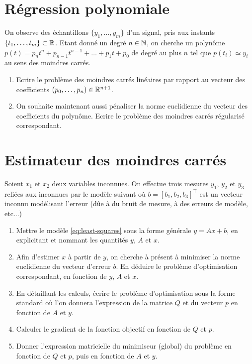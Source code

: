 \section{Régression polynomiale}

On observe des échantillons $\{y_1,\ldots,y_m\}$ d'un signal, pris aux instants $\{t_1,\ldots,t_m\} \subset \mathbb{R}$. Etant donné un degré $n \in \mathbb{N}$, on cherche un polynôme $p(t) = p_n t^n + p_{n-1}t^{n-1} + \ldots + p_1 t + p_0$ de degré au plus $n$ tel que $p(t_i) \simeq y_i$ au sens des moindres carrés.
\begin{enumerate}
	\item Ecrire le problème des moindres carrés linéaires par rapport au  vecteur des coefficients $(p_0,\ldots, p_{n}) \in \mathbb{R}^{n+1}$.
	\item On souhaite maintenant aussi pénaliser la norme euclidienne du vecteur des coefficients du polynôme. Ecrire le problème des moindres carrés régularisé correspondant.
\end{enumerate}

\section{Estimateur des moindres carrés}

Soient $x_1$ et $x_2$ deux variables inconnues. On effectue trois mesures $y_1$, $y_2$ et $y_3$ reliées aux inconnues par le modèle suivant
%
où $b = [b_1,b_2,b_3]^\top$ est un vecteur inconnu modélisant l'erreur (dûe à du bruit de mesure, à des erreurs de modèle, etc...)
\begin{enumerate}
	\item Mettre le modèle \eqref{eq:least-squares} sous la forme générale $y = Ax+b$, en explicitant et nommant les quantités $y$, $A$ et $x$.
	\item Afin d'estimer $x$ à partir de $y$, on cherche à présent à minimiser la norme euclidienne du vecteur d'erreur $b$. En déduire le problème d'optimisation correspondant, en fonction de $y$, $A$ et $x$.
	\item En détaillant les calculs, écrire le problème d'optimisation sous la forme standard
	où l'on donnera l'expression de la matrice $Q$ et du vecteur $p$ en fonction de $A$ et $y$.
	\item Calculer le gradient de la fonction objectif en fonction de $Q$ et $p$.
	\item Donner l'expression matricielle du minimiseur (global) du problème en fonction de $Q$ et $p$, puis en fonction de $A$ et $y$.
\end{enumerate}




